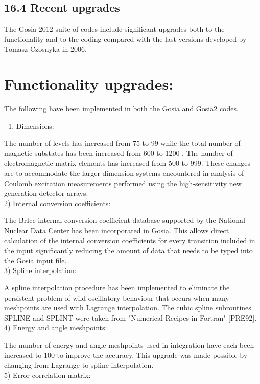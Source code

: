 \documentclass[10pt]{article}
\begin{document}
\subsection*{16.4 Recent upgrades}
The Gosia 2012 suite of codes include significant upgrades both to the functionality and to the coding compared with the last versions developed by Tomasz Czosnyka in 2006.

\section*{Functionality upgrades:}
The following have been implemented in both the Gosia and Gosia2 codes.

\begin{enumerate}
  \item Dimensions:
\end{enumerate}

The number of levels has increased from 75 to 99 while the total number of magnetic substates has been increased from 600 to 1200 . The number of electromagnetic matrix elements has increased from 500 to 999. These changes are to accommodate the larger dimension systems encountered in analysis of Coulomb excitation measurements performed using the high-sensitivity new generation detector arrays.\\
2) Internal conversion coefficients:

The BrIcc internal conversion coefficient database supported by the National Nuclear Data Center has been incorporated in Gosia. This allows direct calculation of the internal conversion coefficients for every transition included in the input significantly reducing the amount of data that needs to be typed into the Gosia input file.\\
3) Spline interpolation:

A spline interpolation procedure has been implemented to eliminate the persistent problem of wild oscillatory behaviour that occurs when many meshpoints are used with Lagrange interpolation. The cubic spline subroutines SPLINE and SPLINT were taken from "Numerical Recipes in Fortran" [PRE92].\\
4) Energy and angle meshpoints:

The number of energy and angle meshpoints used in integration have each been increased to 100 to improve the accuracy. This upgrade was made possible by changing from Lagrange to spline interpolation.\\
5) Error correlation matrix:
\end{document}
